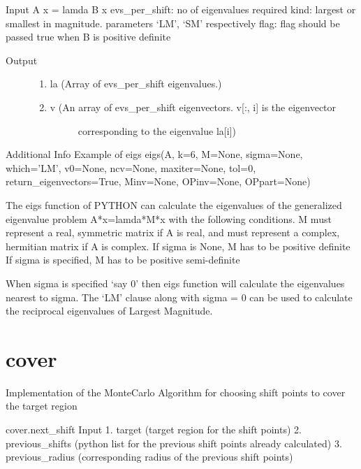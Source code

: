 \documentclass[letterpaper,10pt,english]{sphinxmanual}
\begin{document}
Input
A x = lamda B x
evs\_per\_shift: no of eigenvalues required
kind: largest or smallest in magnitude. parameters `LM', `SM' respectively
flag: flag should be passed true when B is positive definite
\begin{description}
\item[{Output}] \leavevmode\begin{enumerate}
\item {} 
la (Array of evs\_per\_shift eigenvalues.)

\item {} \begin{description}
\item[{v (An array of evs\_per\_shift eigenvectors. v{[}:, i{]} is the eigenvector }] \leavevmode
corresponding to the eigenvalue la{[}i{]})

\end{description}

\end{enumerate}

\end{description}

Additional Info
Example of eigs
eigs(A, k=6, M=None, sigma=None, which='LM', v0=None, ncv=None, maxiter=None, tol=0,
return\_eigenvectors=True, Minv=None, OPinv=None, OPpart=None)

The eigs function of PYTHON can calculate the eigenvalues of the generalized eigenvalue
problem A*x=lamda*M*x with the following conditions.
M must represent a real, symmetric matrix if A is real, and must represent a complex, 
hermitian matrix if A is complex.
If sigma is None, M has to be positive definite 
If sigma is specified, M has to be positive semi-definite

When sigma is specified `say 0' then eigs function will calculate the eigenvalues nearest to sigma. 
The `LM' clause along with sigma = 0 can be used to calculate the reciprocal eigenvalues of 
Largest Magnitude.


\section{cover}
\label{index:cover}\label{index:module-cover}
Implementation of the MonteCarlo Algorithm for choosing shift points to cover the target region

cover.next\_shift
Input
1. target (target region for the shift points)
2. previous\_shifts (python list for the previous shift points already calculated)
3. previous\_radius (corresponding radius of the previous shift points)
\end{document}
